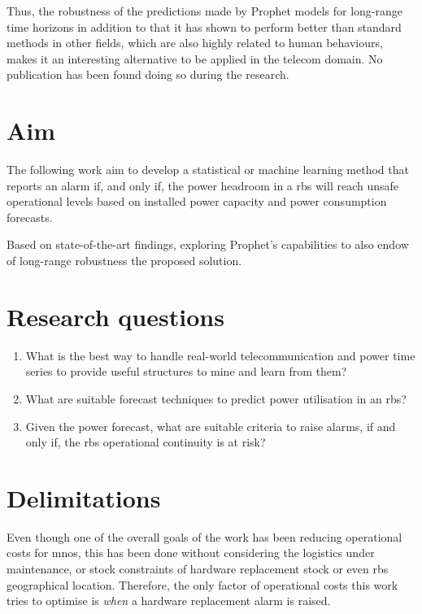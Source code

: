 
Thus, the robustness of the predictions made by Prophet models for long-range time horizons in addition to that it has shown to perform better than standard methods in other fields, which are also highly related to human behaviours, makes it an interesting alternative to be applied in the telecom domain. No publication has been found doing so during the research.



\pagebreak
\section{Aim}
\label{sec:aim}

The following work aim to develop a statistical or machine learning method that reports an alarm if, and only if, the power headroom in a \ac{rbs} will reach unsafe operational levels based on installed power capacity and power consumption forecasts. 

Based on state-of-the-art findings, exploring Prophet's capabilities to also endow of long-range robustness the proposed solution.


\section{Research questions}
\label{sec:research-questions}

\begin{enumerate}
	\item What is the best way to handle real-world telecommunication and power time series to provide useful structures to mine and learn from them?
	\item What are suitable forecast techniques to predict power utilisation in an \ac{rbs}?
	\item Given the power forecast, what are suitable criteria to raise alarms, if and only if, the \ac{rbs} operational continuity is at risk?
\end{enumerate}

\section{Delimitations}
\label{sec:delimitations}


Even though one of the overall goals of the work has been reducing operational costs for \acp{mno}, this has been done without considering the logistics under maintenance, or stock constraints of hardware replacement stock or even \ac{rbs} geographical location. Therefore, the only factor of operational costs this work tries to optimise is \emph{when} a hardware replacement alarm is raised.



